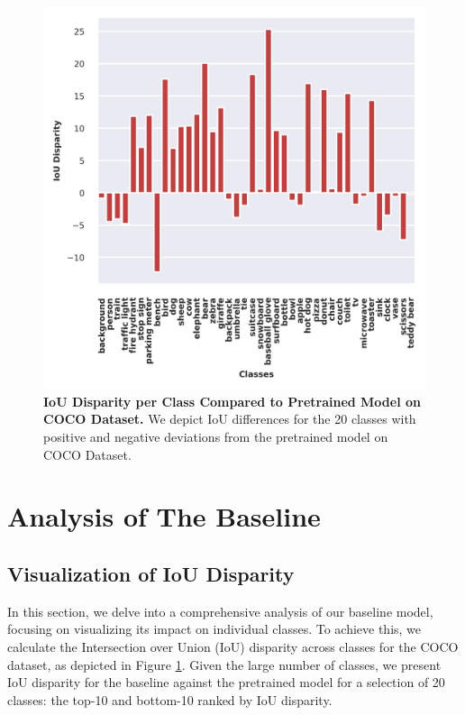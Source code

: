 \begin{figure}[htb!]
  \centering
  \includegraphics[width=0.9\linewidth, height=0.6\textheight]{figures/fig_plots/ioucoco.png}
  \caption[\textbf{IoU Disparity per Class Compared to Pretrained Model on COCO Dataset.}]{\textbf{IoU Disparity per Class Compared to Pretrained Model on COCO Dataset.} We depict IoU differences for the 20 classes with positive and negative deviations from the pretrained model on COCO Dataset.}
  \label{fig:cocomiou}
\end{figure}

\section{Analysis of The Baseline}
\subsection{Visualization of IoU Disparity}
In this section, we delve into a comprehensive analysis of our baseline model, focusing on visualizing its impact on individual classes. To achieve this, we calculate the Intersection over Union (IoU) disparity across classes for the COCO dataset, as depicted in Figure \ref{fig:cocomiou}. Given the large number of classes, we present IoU disparity for the baseline against the pretrained model for a selection of 20 classes: the top-10 and bottom-10 ranked by IoU disparity.

